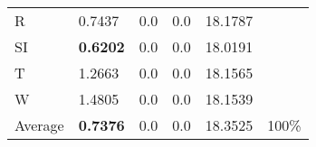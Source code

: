 \documentclass[11pt, a4paper]{article}
\begin{document}
\begin{table}[H]
\begin{tabular}{llllll}
R                                & 0.7437                            & 0.0                               & 0.0                                  & 18.1787                                     &                                   \\
SI                        & \textbf{0.6202}                   & 0.0                               & 0.0                                  & 18.0191                                     &                                   \\
T                              & 1.2663                            & 0.0                               & 0.0                                  & 18.1565                                     &                                   \\
W                             & 1.4805                            & 0.0                               & 0.0                                  & 18.1539                                     &                                   \\ \hline
Average                               & \textbf{0.7376}                   & 0.0                               & 0.0                                  & 18.3525                                     & 100\%
\end{tabular}
\end{table}
\end{document}
